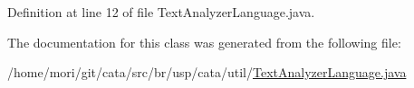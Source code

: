 Definition at line 12 of file Text\+Analyzer\+Language.\+java.



The documentation for this class was generated from the following file\+:\begin{DoxyCompactItemize}
\item 
/home/mori/git/cata/src/br/usp/cata/util/\hyperlink{_text_analyzer_language_8java}{Text\+Analyzer\+Language.\+java}\end{DoxyCompactItemize}
